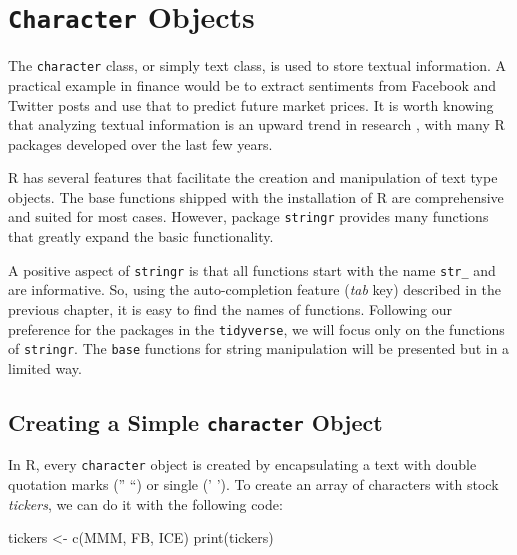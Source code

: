 \documentclass[
  12pt,
]{book}
\newenvironment{Shaded}{\begin{snugshade}}{\end{snugshade}}
\newcommand{\FunctionTok}[1]{\textcolor[rgb]{0,0,0}{#1}}
\newcommand{\NormalTok}[1]{#1}
\newcommand{\OtherTok}[1]{\textcolor[rgb]{0.37,0.37,0.37}{#1}}
\newcommand{\StringTok}[1]{\textcolor[rgb]{0.5,0.5,0.5}{#1}}
\begin{document}
\hypertarget{character-objects}{%
\section{\texorpdfstring{\texttt{Character} Objects}{Character Objects}}\label{character-objects}}

The \texttt{character} class, or simply text class, is used to store textual information. A practical example in finance would be to extract sentiments from Facebook and Twitter posts and use that to predict future market prices. It is worth knowing that analyzing textual information is an upward trend in research \citep{gentzkow2017text}, with many R packages developed over the last few years.

R has several features that facilitate the creation and manipulation of text type objects. The base functions shipped with the installation of R are comprehensive and suited for most cases. However, package \texttt{stringr} \citep{R-stringr} provides many functions that greatly expand the basic functionality.

A positive aspect of \texttt{stringr} is that all functions start with the name \texttt{str\_} and are informative. So, using the auto-completion feature (\emph{tab} key) described in the previous chapter, it is easy to find the names of functions. Following our preference for the packages in the \texttt{tidyverse}, we will focus only on the functions of \texttt{stringr}. The \texttt{base} functions for string manipulation will be presented but in a limited way. 

\hypertarget{creating-a-simple-character-object}{%
\subsection{\texorpdfstring{Creating a Simple \texttt{character} Object}{Creating a Simple character Object}}\label{creating-a-simple-character-object}}

In R, every \texttt{character} object is created by encapsulating a text with double quotation marks ('' ``) or single (' '). To create an array of characters with stock \emph{tickers}, we can do it with the following code: 

\begin{Shaded}
\begin{Highlighting}[]
\NormalTok{tickers }\OtherTok{\textless{}{-}} \FunctionTok{c}\NormalTok{(}\StringTok{\textquotesingle{}MMM\textquotesingle{}}\NormalTok{, }\StringTok{\textquotesingle{}FB\textquotesingle{}}\NormalTok{, }\StringTok{\textquotesingle{}ICE\textquotesingle{}}\NormalTok{)}
\FunctionTok{print}\NormalTok{(tickers)}
\end{Highlighting}
\end{Shaded}
\end{document}
